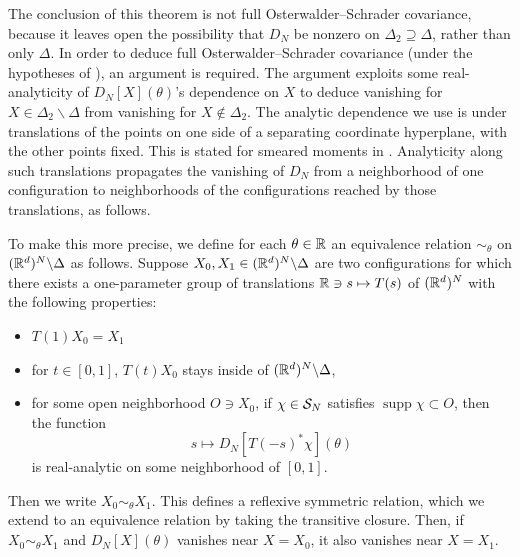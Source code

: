 The conclusion of this theorem is not full Osterwalder--Schrader covariance, because it leaves open the possibility that $D_N$ be nonzero on $\Delta_2\supseteq \Delta $, rather than only $\Delta$. 
In order to deduce full Osterwalder--Schrader covariance (under the hypotheses of ), an argument is required.
The argument exploits some real-analyticity of $D_N[X](\theta)$'s dependence on $X$ to deduce vanishing for $X\in \Delta_2\backslash \Delta$ from vanishing for $X\notin \Delta_2$. 
The analytic dependence we use is under translations of the points on
one side of a separating coordinate hyperplane, with the other points
fixed. This is stated for smeared moments in .
Analyticity along such translations propagates the vanishing of $D_N$
from a neighborhood of one configuration to neighborhoods of the
configurations reached by those translations, as follows.


To make this more precise, we define for each $\theta \in \mathbb{R}$ an equivalence relation $\sim_\theta$ on $(\mathbb{R}^d)^N\backslash \Delta$ as follows. Suppose $X_0,X_1 \in (\mathbb{R}^d)^N\backslash \Delta$ are two configurations for which there exists a one-parameter group of translations $\mathbb{R}\ni s\mapsto T(s)$ of $(\mathbb{R}^d)^N$ with the following properties:
\begin{itemize}
    \item $T(1) X_0= X_1$
    \item for $t\in [0,1]$, $T(t)X_0$ stays inside of $(\mathbb{R}^d)^N\backslash \Delta$, 
    \item  for some open neighborhood $O\ni X_0$, if $\chi\in \mathcal{S}_N$ satisfies $\operatorname{supp} \chi \subset O$, then the function 
    \begin{equation}
        s\mapsto D_N[T(-s)^* \chi](\theta) 
    \end{equation}
    is real-analytic on some neighborhood of $[0,1]$. 
\end{itemize}
Then we write $X_0\sim_\theta X_1$. This defines a reflexive symmetric relation, which we extend to an equivalence relation by taking the transitive closure. Then, if $X_0\sim_\theta X_1$ and $D_N[X](\theta)$ vanishes near $X=X_0$, it also vanishes near $X=X_1$. 


